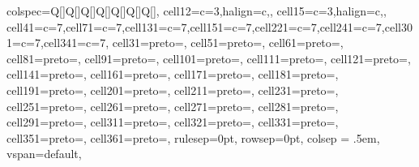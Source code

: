 \documentclass[
]{article}
\begin{document}
\begin{longtblr}[         %
caption={},
caption={Results of multinomial logistic regression model for primary source of drinking water.  Odds-ratios are relative to unfiltered tap water. \label{tblr:m2}},
]                     %
{                     %
colspec={Q[]Q[]Q[]Q[]Q[]Q[]Q[]},
cell{1}{2}={c=3,}{halign=c,},
cell{1}{5}={c=3,}{halign=c,},
cell{4}{1}={c=7}{},cell{7}{1}={c=7}{},cell{13}{1}={c=7}{},cell{15}{1}={c=7}{},cell{22}{1}={c=7}{},cell{24}{1}={c=7}{},cell{30}{1}={c=7}{},cell{34}{1}={c=7}{},
cell{3}{1}={preto={\hspace{1em}}},
cell{5}{1}={preto={\hspace{1em}}},
cell{6}{1}={preto={\hspace{1em}}},
cell{8}{1}={preto={\hspace{1em}}},
cell{9}{1}={preto={\hspace{1em}}},
cell{10}{1}={preto={\hspace{1em}}},
cell{11}{1}={preto={\hspace{1em}}},
cell{12}{1}={preto={\hspace{1em}}},
cell{14}{1}={preto={\hspace{1em}}},
cell{16}{1}={preto={\hspace{1em}}},
cell{17}{1}={preto={\hspace{1em}}},
cell{18}{1}={preto={\hspace{1em}}},
cell{19}{1}={preto={\hspace{1em}}},
cell{20}{1}={preto={\hspace{1em}}},
cell{21}{1}={preto={\hspace{1em}}},
cell{23}{1}={preto={\hspace{1em}}},
cell{25}{1}={preto={\hspace{1em}}},
cell{26}{1}={preto={\hspace{1em}}},
cell{27}{1}={preto={\hspace{1em}}},
cell{28}{1}={preto={\hspace{1em}}},
cell{29}{1}={preto={\hspace{1em}}},
cell{31}{1}={preto={\hspace{1em}}},
cell{32}{1}={preto={\hspace{1em}}},
cell{33}{1}={preto={\hspace{1em}}},
cell{35}{1}={preto={\hspace{1em}}},
cell{36}{1}={preto={\hspace{1em}}},
rulesep={0pt}, rowsep={0pt}, colsep = {.5em}, vspan={default},
}
\end{longtblr}
\end{document}
